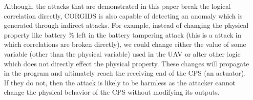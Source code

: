 Although, the attacks that are demonstrated in this paper break the logical correlation directly, \ac{CORGIDS} is also capable of detecting an anomaly which is generated through indirect attacks. For example, instead of changing the physical property like battery \% left in the battery tampering attack (this is a attack in which correlations are broken directly), we could change either the value of some variable (other than the physical variable) used in the \ac{UAV} or alter other logic which does not directly effect the physical property. These changes will propagate in the program and ultimately reach the receiving end of the \ac{CPS} (an actuator). If they do not, then the attack is likely to be harmless as the attacker cannot change the physical behavior of the \ac{CPS} without modifying its outputs. 

\endinput
=====================================================================

